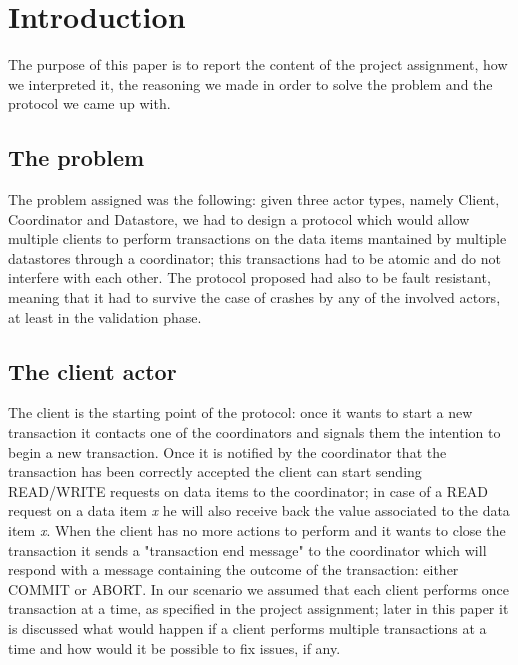 \section{Introduction}
The purpose of this paper is to report the content of the project assignment, how we interpreted it, the reasoning we made in order to solve the problem and the protocol we came up with.

\subsection{The problem}
The problem assigned was the following: given three actor types, namely Client, Coordinator and Datastore, we had to design a protocol which would allow multiple clients to perform transactions on the data items mantained by multiple datastores through a coordinator; this transactions had to be atomic and do not interfere with each other. The protocol proposed had also to be fault resistant, meaning that it had to survive the case of crashes by any of the involved actors, at least in the validation phase.

\subsection{The client actor}
The client is the starting point of the protocol: once it wants to start a new transaction it contacts one of the coordinators and signals them the intention to begin a new transaction.
\newline
Once it is notified by the coordinator that the transaction has been correctly accepted the client can start sending READ/WRITE requests on data items to the coordinator; in case of a READ request on a data item \textit{x} he will also receive back the value associated to the data item \textit{x}.
\newline
When the client has no more actions to perform and it wants to close the transaction it sends a "transaction end message" to the coordinator which will respond with a message containing the outcome of the transaction: either COMMIT or ABORT.
\newline
In our scenario we assumed that each client performs once transaction at a time, as specified in the project assignment; later in this paper it is discussed what would happen if a client performs multiple transactions at a time and how would it be possible to fix issues, if any.

